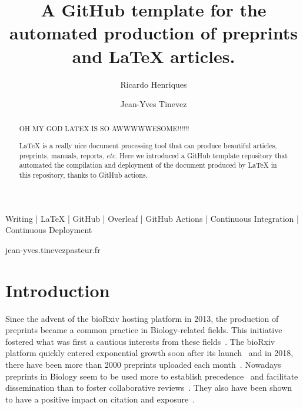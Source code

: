 
\title{A GitHub template for the automated production of preprints and LaTeX articles.}


\author[1\space\Letter]{Ricardo Henriques}
\author[2\space\Letter]{Jean-Yves Tinevez}


\maketitle

\begin{abstract} %


OH MY GOD LATEX IS SO AWWWWWESOME!!!!!!

LaTeX is a really nice document processing tool that can produce beautiful articles, preprints, manuals, reports, \textit{etc}.
Here we introduced a GitHub template repository that automated the compilation and deployment of the document produced by LaTeX in this repository, thanks to GitHub actions.
\end{abstract}


\begin{keywords}
    Writing | LaTeX | GitHub | Overleaf | GitHub Actions | Continuous Integration | Continuous Deployment
\end{keywords}


\begin{corrauthor}
    jean-yves.tinevez\at pasteur.fr
\end{corrauthor}



\section*{Introduction}

Since the advent of the bioRxiv hosting platform in 2013, the production of preprints became a common practice in Biology-related fields.
This initiative fostered what was first a cautious interests from these fields~\cite{Callaway2012}.
The bioRxiv platform quickly entered exponential growth soon after its launch~\cite{Callaway2013} and in 2018, there have been more than 2000 preprints uploaded each month~\cite{Abdill2019}.
Nowadays preprints in Biology seem to be used more to establish precedence~\cite{Vale2016} and facilitate dissemination than to foster collaborative reviews~\cite{Anderson2020}.
They also have been shown to have a positive impact on citation and exposure~\cite{Abdill2019, Fraser2019}.

